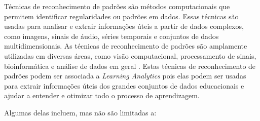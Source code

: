 Técnicas de reconhecimento de padrões são métodos computacionais que permitem identificar regularidades ou padrões em dados. Essas técnicas são usadas para analisar e extrair informações úteis a partir de dados complexos, como imagens, sinais de áudio, séries temporais e conjuntos de dados multidimensionais. {As técnicas de reconhecimento de padrões %
são amplamente utilizadas em diversas áreas, como visão computacional, processamento de sinais, bioinformática e análise de dados em geral \cite{Bishop:2007}}. Estas técnicas de reconhecimento de padrões podem ser associada a \textit{Learning Analytics} pois elas podem ser usadas para extrair informações úteis dos grandes conjuntos de dados educacionais e ajudar a entender e otimizar todo o processo de aprendizagem.

Algumas delas incluem, mas não são limitadas a:


